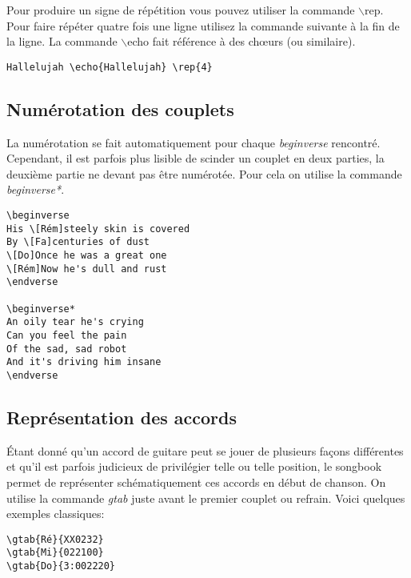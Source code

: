 \documentclass[a4paper]{article}
\begin{document}
Pour produire un signe de répétition vous pouvez utiliser la commande
$\backslash$rep. Pour faire répéter quatre fois une ligne utilisez la
commande suivante à la fin de la ligne. La commande $\backslash$echo
fait référence à des ch\oe{}urs (ou similaire).

\begin{verbatim}
Hallelujah \echo{Hallelujah} \rep{4}
\end{verbatim}

\subsection{Numérotation des couplets}

La numérotation se fait automatiquement pour chaque \emph{beginverse}
rencontré. Cependant, il est parfois plus lisible de scinder un
couplet en deux parties, la deuxième partie ne devant pas être
numérotée. Pour cela on utilise la commande \emph{beginverse*}.
 
\begin{verbatim}
\beginverse
His \[Rém]steely skin is covered
By \[Fa]centuries of dust
\[Do]Once he was a great one
\[Rém]Now he's dull and rust
\endverse

\beginverse*
An oily tear he's crying
Can you feel the pain
Of the sad, sad robot
And it's driving him insane
\endverse
\end{verbatim}

\subsection{Représentation des accords}

Étant donné qu'un accord de guitare peut se jouer de plusieurs façons
différentes et qu'il est parfois judicieux de privilégier telle ou
telle position, le songbook permet de représenter schématiquement ces
accords en début de chanson. On utilise la commande \emph{gtab} juste
avant le premier couplet ou refrain. Voici quelques exemples classiques:

\begin{verbatim}
\gtab{Ré}{XX0232}
\gtab{Mi}{022100}
\gtab{Do}{3:002220}
\end{verbatim}
\end{document}
